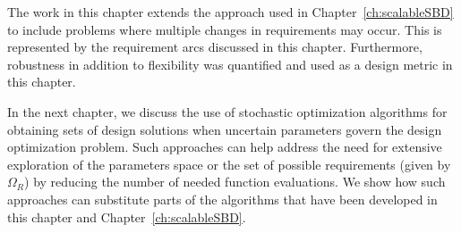 The work in this chapter extends the approach used in Chapter~\ref{ch:scalableSBD} to include problems where multiple changes in requirements may occur. This is represented by the requirement arcs discussed in this chapter. Furthermore, robustness in addition to flexibility was quantified and used as a design metric in this chapter.

In the next chapter, we discuss the use of stochastic optimization algorithms for obtaining sets of design solutions when uncertain parameters govern the design optimization problem. Such approaches can help address the need for extensive exploration of the parameters space or the set of possible requirements (given by $\Omega_R$) by reducing the number of needed function evaluations. We show how such approaches can substitute parts of the algorithms that have been developed in this chapter and Chapter~\ref{ch:scalableSBD}.